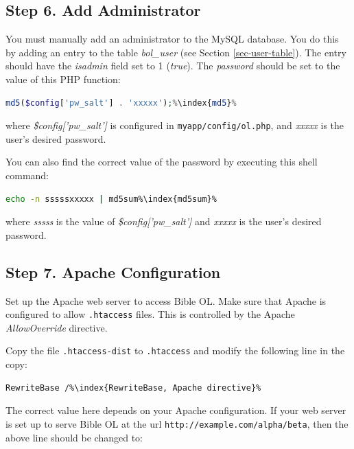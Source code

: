 \documentclass[11pt,oneside,a4paper]{memoir}
\newcommand{\q}{{\mainnolig '}}
\begin{document}
\subsection{Step 6. Add Administrator}

You must manually add an administrator to the MySQL database. You do this by adding an entry to the
table \emph{bol\_user} (see Section \ref{sec-user-table}).
The entry should have the \emph{isadmin} field set to 1 (\emph{true}). The
\emph{password} should be set to the value of this PHP function:

\begin{lstlisting}[language=PHP]
  md5($config['pw_salt'] . 'xxxxx');%\index{md5}%
\end{lstlisting}

\noindent
where \emph{\$config[\q pw\_salt\q]} is configured in \texttt{myapp/config/ol.php}, and
\emph{xxxxx} is the user's desired password.

You can also find the correct value of the password by executing this shell command:

\begin{lstlisting}[language=bash]
  echo -n sssssxxxxx | md5sum%\index{md5sum}%
\end{lstlisting}

\noindent
where \emph{sssss} is the value of \emph{\$config[\q pw\_salt\q]} and \emph{xxxxx} is the user's
desired password.


\subsection{Step 7. Apache Configuration}

Set up the Apache web server to access Bible OL. Make sure that Apache is configured to allow
\texttt{.htaccess} files. This is controlled by the Apache
\emph{AllowOverride} directive.

Copy the file \texttt{.htaccess-dist} to \texttt{.htaccess} and modify the following line in the
copy:

\begin{lstlisting}
RewriteBase /%\index{RewriteBase, Apache directive}%
\end{lstlisting}

The correct value here depends on your Apache configuration. If your web server is set up to serve
Bible OL at the url \texttt{http://example.com/alpha/beta}, then the above line should be changed to:
\end{document}
